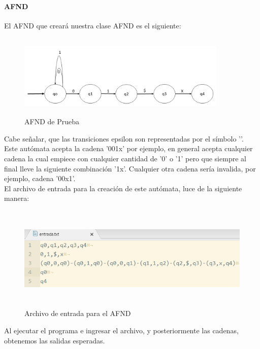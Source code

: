 	\paragraph{AFND}
	El AFND que creará nuestra clase AFND es el siguiente:
	\begin{figure}[H]
		\begin{center}
			\includegraphics[width=10cm, height=4cm]{img/afnd_auto.png}
			\caption{AFND de Prueba}
			\label{fig:tablas11}
		\end{center}
	\end{figure}
	Cabe señalar, que las transiciones epsilon son representadas por el símbolo '\textdollar'.\\
	Este autómata acepta la cadena '001x' por ejemplo, en general acepta cualquier cadena la cual empiece con cualquier cantidad de '0' o '1' pero que siempre al final lleve la siguiente combinación '1x'. Cualquier otra cadena sería invalida, por ejemplo, cadena '00x1'.\\
	El archivo de entrada para la creación de este autómata, luce de la siguiente manera:
	\begin{figure}[H]
		\begin{center}
			\includegraphics[width=12cm, height=5cm]{img/afnd_entrada.png}
			\caption{Archivo de entrada para el AFND}
			\label{fig:tablas12}
		\end{center}
	\end{figure}
	\newpage
	Al ejecutar el programa e ingresar el archivo, y posteriormente las cadenas, obtenemos las salidas esperadas.
